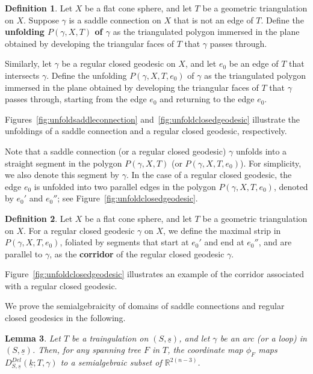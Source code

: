 \documentclass{compositio}
\numberwithin{equation}{section}
\numberwithin{figure}{section}
\theoremstyle{definition}
\newtheorem{definition}{Definition}[section]
\theoremstyle{plain}
\newtheorem{lemma}[definition]{Lemma}
\begin{document}
{\begin{definition}
    Let $X$ be a flat cone sphere, and let $T$ be a geometric triangulation on $X$. Suppose $\gamma$ is a saddle connection on $X$ that is not an edge of $T$. Define the \textbf{unfolding $P(\gamma, X, T)$ of $\gamma$} as the triangulated polygon immersed in the plane obtained by developing the triangular faces of $T$ that $\gamma$ passes through.
    
    Similarly, let $\gamma$ be a regular closed geodesic on $X$, and let $e_0$ be an edge of $T$ that intersects $\gamma$. Define the {unfolding $P(\gamma, X, T, e_0)$ of $\gamma$} as the triangulated polygon immersed in the plane obtained by developing the triangular faces of $T$ that $\gamma$ passes through, starting from the edge $e_0$ and returning to the edge $e_0$.
\end{definition}

Figures~\ref{fig:unfoldsaddleconnection} and~\ref{fig:unfoldclosedgeodesic} illustrate the unfoldings of a saddle connection and a regular closed geodesic, respectively.

Note that a saddle connection (or a regular closed geodesic) $\gamma$ unfolds into a straight segment in the polygon $P(\gamma, X, T)$ (or $P(\gamma, X, T, e_0)$). For simplicity, we also denote this segment by $\gamma$. In the case of a regular closed geodesic, the edge $e_0$ is unfolded into two parallel edges in the polygon $P(\gamma, X, T, e_0)$, denoted by $e_0'$ and $e_0''$; see Figure~\ref{fig:unfoldclosedgeodesic}.

\begin{definition}
    Let $X$ be a flat cone sphere, and let $T$ be a geometric triangulation on $X$. For a regular closed geodesic $\gamma$ on $X$, we define the maximal strip in $P(\gamma, X, T, e_0)$, foliated by segments that start at $e_0'$ and end at $e_0''$, and are parallel to $\gamma$, as the \textbf{corridor} of the regular closed geodesic $\gamma$.
\end{definition}

Figure~\ref{fig:unfoldclosedgeodesic} illustrates an example of the corridor associated with a regular closed geodesic.


We prove the semialgebraicity of domains of saddle connections and regular closed geodesics in the following.

\begin{lemma}\label{lem:semialgdomain}
    Let $T$ be a traingulation on $(S,\underline{s})$, and let $\gamma$ be an arc (or a loop) in $(S,\underline{s})$. Then, for any spanning tree $F$ in $T$, the coordinate map $\phi_F$ maps $D_{S,\underline{s}}^{Del}(\underline{k};T,\gamma)$ to a semialgebraic subset of $\mathbb{R}^{2(n-3)}$.
\end{lemma}

}
\end{document}
